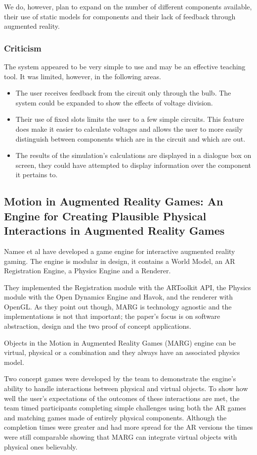 We do, however, plan to expand on the number of different components available, their use of static models for components and their lack of feedback through augmented reality.

\subsubsection{Criticism}
The system appeared to be very simple to use and may be an effective teaching tool. It was limited, however, in the following areas.
\begin{itemize}
\item The user receives feedback from the circuit only through the bulb. The system could be expanded to show the effects of voltage division.
\item Their use of fixed slots limits the user to a few simple circuits. This feature does make it easier to calculate voltages and allows the user to more easily distinguish between components which are in the circuit and which are out. 
\item The results of the simulation's calculations are displayed in a dialogue box on screen, they could have attempted to display information over the component it pertains to.
\end{itemize}

\subsection{Motion in Augmented Reality Games: An Engine for Creating Plausible Physical Interactions in Augmented Reality Games}

Namee et al\cite{namee2010motion} have developed a game engine for interactive augmented reality gaming. The engine is modular in design, it contains a World Model, an AR Registration Engine, a Physics Engine and a Renderer. 

They implemented the Registration module with the ARToolkit API, the Physics module with the Open Dynamics Engine and Havok, and the renderer with OpenGL. As they point out though, MARG is technology agnostic and the implementations is not that important; the paper's focus is on software abstraction, design and the two proof of concept applications.

Objects in the Motion in Augmented Reality Games (MARG) engine can be virtual, physical or a combination and they always have an associated physics model.

Two concept games were developed by the team to demonstrate the engine's ability to handle interactions between physical and virtual objects. To show how well the user's expectations of the outcomes of these interactions are met, the team timed participants completing simple challenges using both the AR games and matching games made of entirely physical components. Although the completion times were greater and had more spread for the AR versions the times were still comparable
showing that MARG can integrate virtual objects with physical ones believably.

